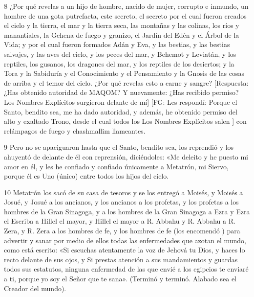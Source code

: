 \par 8 ¿Por qué revelas a un hijo de hombre, nacido de mujer, corrupto e inmundo, un hombre de una gota putrefacta, este secreto, el secreto por el cual fueron creados el cielo y la tierra, el mar y la tierra seca, las montañas y las colinas, los ríos y manantiales, la Gehena de fuego y granizo, el Jardín del Edén y el Árbol de la Vida; y por el cual fueron formados Adán y Eva, y las bestias, y las bestias salvajes, y las aves del cielo, y los peces del mar, y Behemot y Leviatán, y los reptiles, los gusanos, los dragones del mar, y los reptiles de los desiertos; y la Tora y la Sabiduría y el Conocimiento y el Pensamiento y la Gnosis de las cosas de arriba y el temor del cielo. ¿Por qué revelas esto a carne y sangre? [Respuesta: ¿Has obtenido autoridad de MAQOM? Y nuevamente: ¿Has recibido permiso? Los Nombres Explícitos surgieron delante de mí] [FG: Les respondí: Porque el Santo, bendito sea, me ha dado autoridad, y además, he obtenido permiso del alto y exaltado Trono, desde el cual todos los Los Nombres Explícitos salen ] con relámpagos de fuego y chashmallim llameantes.

\par 9 Pero no se apaciguaron hasta que el Santo, bendito sea, los reprendió y los ahuyentó de delante de él con reprensión, diciéndoles: «Me deleito y he puesto mi amor en él, y les he confiado y confiado únicamente a Metatrón, mi Siervo, porque él es Uno (único) entre todos los hijos del cielo.

\par 10 Metatrón los sacó de su casa de tesoros y se los entregó a Moisés, y Moisés a Josué, y Josué a los ancianos, y los ancianos a los profetas, y los profetas a los hombres de la Gran Sinagoga, y a los hombres de la Gran Sinagoga a Ezra y Ezra el Escriba a Hillel el mayor, y Hillel el mayor a R. Abbahu y R. Abbahu a R. Zera, y R. Zera a los hombres de fe, y los hombres de fe (los encomendó ) para advertir y sanar por medio de ellos todas las enfermedades que azotan el mundo, como está escrito: «Si escuchas atentamente la voz de Jehová tu Dios, y haces lo recto delante de sus ojos, y Si prestas atención a sus mandamientos y guardas todos sus estatutos, ninguna enfermedad de las que envié a los egipcios te enviaré a ti, porque yo soy el Señor que te sana». (Terminó y terminó. Alabado sea el Creador del mundo).




